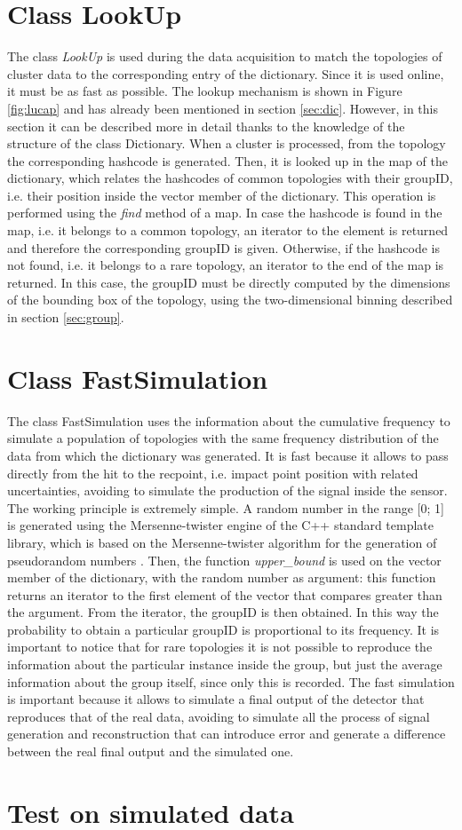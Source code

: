 \section{Class LookUp}
The class \textit{LookUp} is used during the data acquisition to match the topologies of cluster data to the corresponding entry of the dictionary. Since it is used online, it must be as fast as possible. The lookup mechanism is shown in Figure \ref{fig:lucap} and has already been mentioned in section \ref{sec:dic}. However, in this section it can be described more in detail thanks to the knowledge of the structure of the class Dictionary. When a cluster is processed, from the topology the corresponding hashcode is generated. Then, it is looked up in the map of the dictionary, which relates the hashcodes of common topologies with their groupID, i.e. their position inside the vector member of the dictionary. This operation is performed using the \textit{find} method of a map. In case the hashcode is found in the map, i.e. it belongs to a common topology, an iterator to the element is returned and therefore the corresponding groupID is given. Otherwise, if the hashcode is not found, i.e. it belongs to a rare topology, an iterator to the end of the map is returned. In this case, the groupID must be directly computed by the dimensions of the bounding box of the topology, using the two-dimensional binning described in section \ref{sec:group}.
\section{Class FastSimulation}
\label{sec:fast}
The class FastSimulation uses the information about the cumulative frequency to simulate a population of topologies with the same frequency distribution of the data from which the dictionary was generated. It is fast because it allows to pass directly from the hit to the recpoint, i.e. impact point position with related uncertainties, avoiding to simulate the production of the signal inside the sensor. The working principle is extremely simple. A random number in the range [0; 1] is generated using the Mersenne-twister engine of the C++ standard template library, which is based on the Mersenne-twister algorithm for the generation of pseudorandom numbers \cite{mersenne}. Then, the function \textit{upper\_bound} is used on the vector member of the dictionary, with the random number as argument: this function returns an iterator to the first element of the vector that compares greater than the argument. From the iterator, the groupID is then obtained. In this way the probability to obtain a particular groupID is proportional to its frequency. It is important to notice that for rare topologies it is not possible to reproduce the information about the particular instance inside the group, but just the average information about the group itself, since only this is recorded. The fast simulation is important because it allows to simulate a final output of the detector that reproduces that of the real data, avoiding to simulate all the process of signal generation
and reconstruction that can introduce error and generate a difference between the real final output and the simulated one. 
%
\section{Test on simulated data}